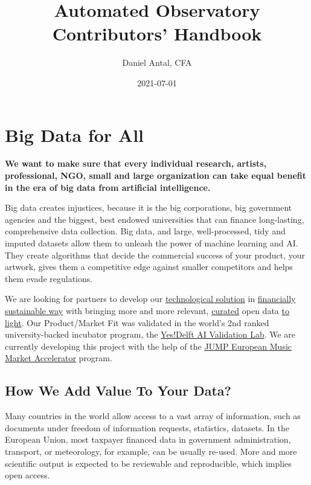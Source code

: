 \documentclass[
  a4paper,
  openany, a4paper, oneside]{book}
\title{Automated Observatory Contributors' Handbook}
\author{Daniel Antal, CFA}
\date{2021-07-01}
\begin{document}
\maketitle

{
\hypersetup{linkcolor=}
\setcounter{tocdepth}{1}
\tableofcontents
}
\listoffigures
{}
\hypertarget{big-data-for-all}{%
\chapter*{Big Data for All}\label{big-data-for-all}}

\textbf{We want to make sure that every individual research, artists, professional, NGO, small and large organization can take equal benefit in the era of big data from artificial intelligence.}

Big data creates injustices, because it is the big corporations, big government agencies and the biggest, best endowed universities that can finance long-lasting, comprehensive data collection. Big data, and large, well-processed, tidy and imputed datasets allow them to unleash the power of machine learning and AI. They create algorithms that decide the commercial success of your product, your artwork, gives them a competitive edge against smaller competitors and helps them evade regulations.

We are looking for partners to develop our \protect\hyperlink{app}{technological solution} in \href{service}{financially sustainable way} with bringing more and more relevant, \protect\hyperlink{data-curators}{curated} open data \protect\hyperlink{open-data}{to light}. Our Product/Market Fit was validated in the world's 2nd ranked university-backed incubator program, the \href{https://music.dataobservatory.eu/post/2020-09-25-yesdelft-validation/}{Yes!Delft AI Validation Lab}. We are currently developing this project with the help of the \href{https://www.jumpmusic.eu/fellow2021/automated-music-observatory/}{JUMP European Music Market Accelerator} program.

\hypertarget{data-value-added}{%
\section*{How We Add Value To Your Data?}\label{data-value-added}}

Many countries in the world allow access to a vast array of information,
such as documents under freedom of information requests, statistics,
datasets. In the European Union, most taxpayer financed data in
government administration, transport, or meteorology, for example, can
be usually re-used. More and more scientific output is expected to be
reviewable and reproducible, which implies open access.
\end{document}
